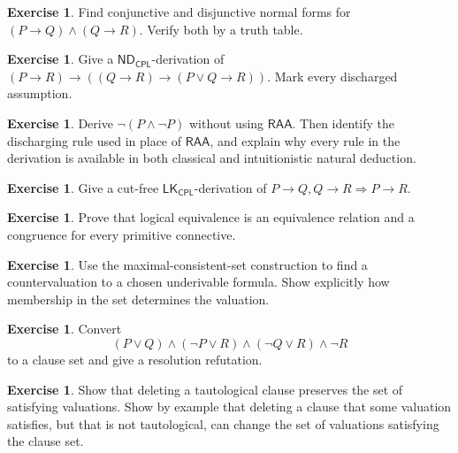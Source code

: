 \documentclass[11pt,oneside,openany]{book}
\theoremstyle{definition}
\newtheorem{exercise}[definition]{Exercise}
\theoremstyle{plain}
\theoremstyle{remark}
\newcommand{\ND}{\mathsf{ND}}
\newcommand{\LK}{\mathsf{LK}}
\newcommand{\CPL}{\mathsf{CPL}}
\begin{document}
\begin{exercise}
\label{ex:prop-metatheory-05}
Find conjunctive and disjunctive normal forms for
\((P\to Q)\land(Q\to R)\).  Verify both by a truth table.
\end{exercise}

\begin{exercise}
\label{ex:prop-metatheory-06}
Give a \(\ND_{\CPL}\)-derivation of
\((P\to R)\to((Q\to R)\to(P\lor Q\to R))\).
Mark every discharged assumption.
\end{exercise}

\begin{exercise}
\label{ex:prop-metatheory-07}
Derive \(\neg(P\land\neg P)\) without using \(\mathsf{RAA}\).  Then
identify the discharging rule used in place of \(\mathsf{RAA}\), and explain
why every rule in the derivation is available in both classical and
intuitionistic natural deduction.
\end{exercise}

\begin{exercise}
\label{ex:prop-metatheory-08}
Give a cut-free \(\LK_{\CPL}\)-derivation of
\(P\to Q, Q\to R\Rightarrow P\to R\).
\end{exercise}

\begin{exercise}
\label{ex:prop-metatheory-09}
Prove that logical equivalence is an equivalence relation and a congruence for
every primitive connective.
\end{exercise}

\begin{exercise}
\label{ex:prop-metatheory-10}
Use the maximal-consistent-set construction to find a countervaluation to a
chosen underivable formula.  Show explicitly how membership in the
set determines the valuation.
\end{exercise}

\begin{exercise}
\label{ex:prop-metatheory-11}
Convert
\[
 (P\lor Q)\land(\neg P\lor R)\land(\neg Q\lor R)\land\neg R
\]
to a clause set and give a resolution refutation.
\end{exercise}

\begin{exercise}
\label{ex:prop-metatheory-12}
Show that deleting a tautological clause preserves the set of satisfying
valuations.  Show by example that deleting a clause that some valuation
satisfies, but that is not tautological, can change the set of valuations
satisfying the clause set.
\end{exercise}
\end{document}
